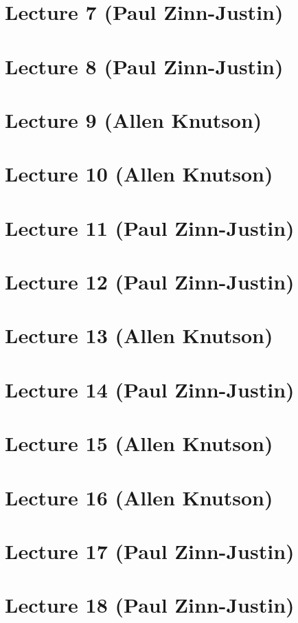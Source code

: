 \documentclass[12pt]{amsart}
\numberwithin{equation}{section}
\theoremstyle{definition}
\numberwithin{figure}{section}
\begin{document}
\section{Lecture 7 (Paul Zinn-Justin)}

\section{Lecture 8 (Paul Zinn-Justin)}

\section{Lecture 9 (Allen Knutson)}

\section{Lecture 10 (Allen Knutson)}

\section{Lecture 11 (Paul Zinn-Justin)}

\section{Lecture 12 (Paul Zinn-Justin)}

\section{Lecture 13 (Allen Knutson)}

\section{Lecture 14 (Paul Zinn-Justin)}

\section{Lecture 15 (Allen Knutson)}

\section{Lecture 16 (Allen Knutson)}

\section{Lecture 17 (Paul Zinn-Justin)}

\section{Lecture 18 (Paul Zinn-Justin)}
\end{document}

